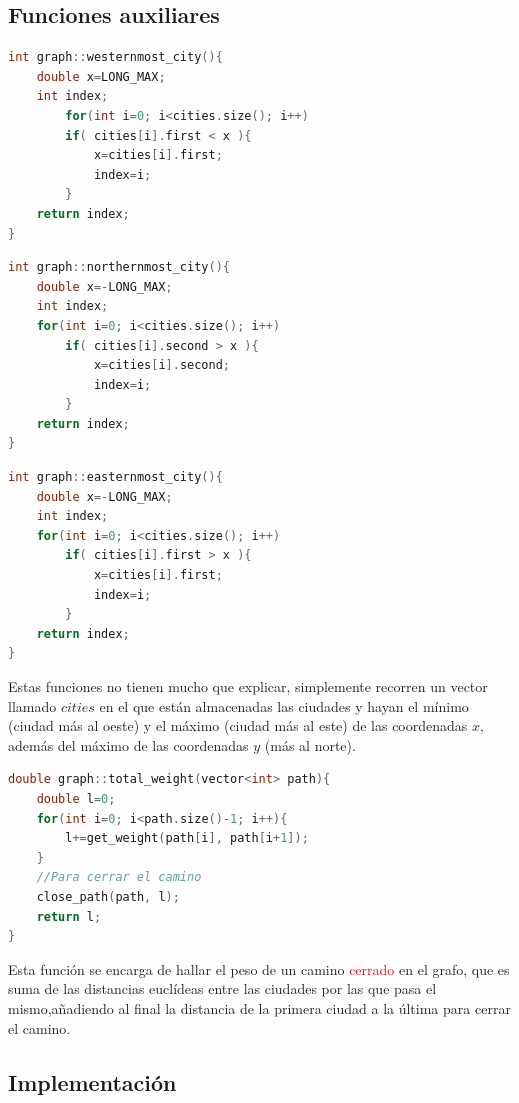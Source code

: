 \documentclass[11pt]{article}
\begin{document}
\subsection{Funciones auxiliares}
\begin{lstlisting}[language=C++, caption=Encontrar la ciudad más al oeste]
int graph::westernmost_city(){
	double x=LONG_MAX;
	int index;
		for(int i=0; i<cities.size(); i++)
		if( cities[i].first < x ){
			x=cities[i].first;
			index=i;
		}
	return index;
}
\end{lstlisting}

\begin{lstlisting}[language=C++, caption=Encontrar la ciudad más al norte]
int graph::northernmost_city(){
	double x=-LONG_MAX;
	int index;
	for(int i=0; i<cities.size(); i++)
		if( cities[i].second > x ){
			x=cities[i].second;
			index=i;
		}
	return index;
}
\end{lstlisting}

\begin{lstlisting}[language=C++, caption=Encontrar la ciudad más al este]
int graph::easternmost_city(){
	double x=-LONG_MAX;
	int index;
	for(int i=0; i<cities.size(); i++)
		if( cities[i].first > x ){
			x=cities[i].first;
			index=i;
		}
	return index;
}
\end{lstlisting}

Estas funciones no tienen mucho que explicar, simplemente recorren un vector llamado $cities$ en el que están almacenadas las ciudades y hayan el mínimo (ciudad más al oeste) y el máximo (ciudad más al este) de las coordenadas $x$, además del máximo de las coordenadas $y$ (más al norte).

\begin{lstlisting}[language=C++, caption=Hallar el peso de un camino cerrado]
double graph::total_weight(vector<int> path){
	double l=0;
	for(int i=0; i<path.size()-1; i++){
		l+=get_weight(path[i], path[i+1]);
	}
	//Para cerrar el camino
	close_path(path, l);
	return l;
}
\end{lstlisting}

Esta función se encarga de hallar el peso de un camino \textcolor{red}{cerrado} en el grafo, que es suma de las distancias euclídeas entre las ciudades por las que pasa el mismo,añadiendo al final la distancia de la primera ciudad a la última para cerrar el camino.\\

\subsection{Implementación}
\end{document}
